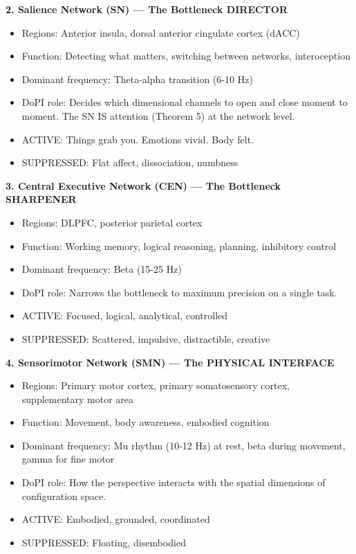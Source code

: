 \textbf{2. Salience Network (SN) — The Bottleneck DIRECTOR}

\begin{itemize}[nosep,leftmargin=*]
  \item Regions: Anterior insula, dorsal anterior cingulate cortex (dACC)
  \item Function: Detecting what matters, switching between networks, interoception
  \item Dominant frequency: Theta-alpha transition (6-10 Hz)
  \item DoPI role: Decides which dimensional channels to open and close moment to moment. The SN IS attention (Theorem 5) at the network level.
  \item ACTIVE: Things grab you. Emotions vivid. Body felt.
  \item SUPPRESSED: Flat affect, dissociation, numbness
\end{itemize}


\textbf{3. Central Executive Network (CEN) — The Bottleneck SHARPENER}

\begin{itemize}[nosep,leftmargin=*]
  \item Regions: DLPFC, posterior parietal cortex
  \item Function: Working memory, logical reasoning, planning, inhibitory control
  \item Dominant frequency: Beta (15-25 Hz)
  \item DoPI role: Narrows the bottleneck to maximum precision on a single task.
  \item ACTIVE: Focused, logical, analytical, controlled
  \item SUPPRESSED: Scattered, impulsive, distractible, creative
\end{itemize}


\textbf{4. Sensorimotor Network (SMN) — The PHYSICAL INTERFACE}

\begin{itemize}[nosep,leftmargin=*]
  \item Regions: Primary motor cortex, primary somatosensory cortex, supplementary motor area
  \item Function: Movement, body awareness, embodied cognition
  \item Dominant frequency: Mu rhythm (10-12 Hz) at rest, beta during movement, gamma for fine motor
  \item DoPI role: How the perspective interacts with the spatial dimensions of configuration space.
  \item ACTIVE: Embodied, grounded, coordinated
  \item SUPPRESSED: Floating, disembodied
\end{itemize}


